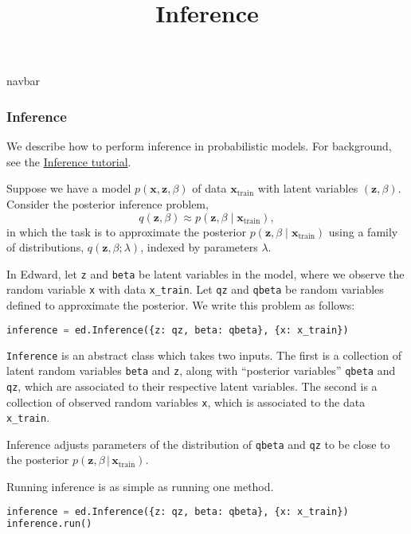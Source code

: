 \title{Inference}

{{navbar}}

\subsubsection{Inference}

We describe how to perform inference in probabilistic models.
For background, see the
\href{/tutorials/inference}{Inference tutorial}.

Suppose we have a model $p(\mathbf{x}, \mathbf{z}, \beta)$ of data $\mathbf{x}_{\text{train}}$ with latent variables $(\mathbf{z}, \beta)$.
Consider the posterior inference problem,
\begin{equation*}
q(\mathbf{z}, \beta)\approx p(\mathbf{z}, \beta\mid \mathbf{x}_{\text{train}}),
\end{equation*}
in which the task is to approximate the posterior
$p(\mathbf{z}, \beta\mid \mathbf{x}_{\text{train}})$
using a family of distributions, $q(\mathbf{z},\beta; \lambda)$,
indexed by parameters $\lambda$.

In Edward, let \texttt{z} and \texttt{beta} be latent variables in the model,
where we observe the random variable \texttt{x} with
data \texttt{x_train}.
Let \texttt{qz} and \texttt{qbeta} be random variables defined to
approximate the posterior.
We write this problem as follows:

\begin{lstlisting}[language=Python]
inference = ed.Inference({z: qz, beta: qbeta}, {x: x_train})
\end{lstlisting}

\texttt{Inference} is an abstract class which takes two inputs.  The
first is a collection of latent random variables \texttt{beta} and
\texttt{z}, along with ``posterior variables'' \texttt{qbeta} and
\texttt{qz}, which are associated to their respective latent
variables.  The second is a collection of observed random variables
\texttt{x}, which is associated to the data \texttt{x_train}.

Inference adjusts parameters of the distribution of \texttt{qbeta}
and \texttt{qz} to be close to the
posterior $p(\mathbf{z}, \beta\,|\,\mathbf{x}_{\text{train}})$.

Running inference is as simple as running one method.

\begin{lstlisting}[language=Python]
inference = ed.Inference({z: qz, beta: qbeta}, {x: x_train})
inference.run()
\end{lstlisting}


